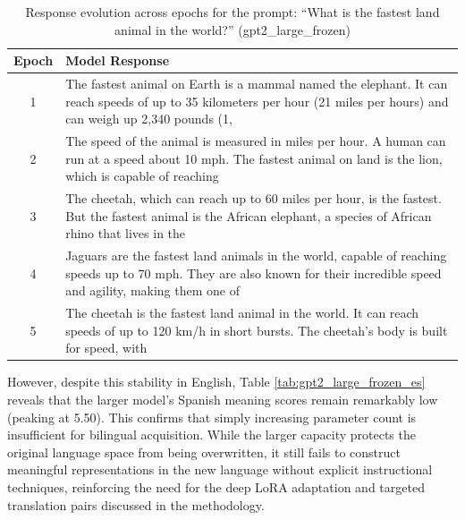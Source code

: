 \begin{table}[!ht]
\centering
\small %
\caption{Response evolution across epochs for the prompt: ``What is the fastest land animal in the world?'' (gpt2\_large\_frozen)}
\label{tab:response_evolution_frozen_en}
\begin{tabularx}{\linewidth}{@{} c X @{}}
\toprule
\textbf{Epoch} & \textbf{Model Response} \\ \midrule

1 & The fastest animal on Earth is a mammal named the elephant. It can reach speeds of up to 35 kilometers per hour (21 miles per hours) and can weigh up 2,340 pounds (1, \\ \addlinespace

2 & The speed of the animal is measured in miles per hour. A human can run at a speed about 10 mph. The fastest animal on land is the lion, which is capable of reaching \\ \addlinespace

3 & The cheetah, which can reach up to 60 miles per hour, is the fastest. But the fastest animal is the African elephant, a species of African rhino that lives in the \\ \addlinespace

4 & Jaguars are the fastest land animals in the world, capable of reaching speeds up to 70 mph. They are also known for their incredible speed and agility, making them one of \\ \addlinespace

5 & The cheetah is the fastest land animal in the world. It can reach speeds of up to 120 km/h in short bursts. The cheetah's body is built for speed, with \\ \bottomrule
\end{tabularx}
\end{table}


However, despite this stability in English, Table \ref{tab:gpt2_large_frozen_es} reveals that the larger model's Spanish meaning scores remain remarkably low (peaking at 5.50). This confirms that simply increasing parameter count is insufficient for bilingual acquisition. While the larger capacity protects the original language space from being overwritten, it still fails to construct meaningful representations in the new language without explicit instructional techniques, reinforcing the need for the deep LoRA adaptation and targeted translation pairs discussed in the methodology.